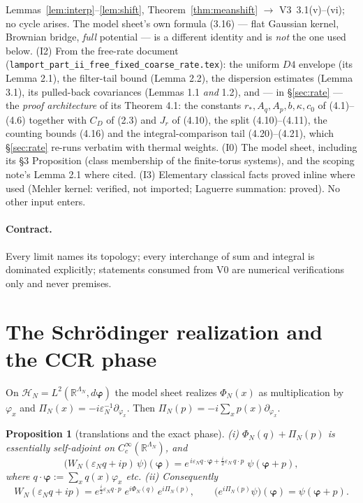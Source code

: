 \documentclass[11pt,a4paper]{article}
\theoremstyle{plain}
\newtheorem{proposition}[theorem]{Proposition}
\theoremstyle{definition}
\newcommand{\R}{\mathbb{R}}
\newcommand{\HH}{\mathcal{H}}
\newcommand{\eps}{\varepsilon}
\begin{document}
Lemmas~\ref{lem:interp}--\ref{lem:shift}, Theorem~\ref{thm:meanshift}
$\to$ V3~3.1(v)--(vi); no cycle arises. The model sheet's own formula (3.16) --- flat Gaussian
kernel, Brownian bridge, \emph{full} potential --- is a different identity and
is \emph{not} the one used below. (I2) From the free-rate document
(\texttt{lamport\_part\_ii\_free\_}\allowbreak\texttt{fixed\_coarse\_rate.tex}): the uniform $D4$
envelope (its Lemma 2.1), the filter-tail bound (Lemma 2.2), the dispersion
estimates (Lemma 3.1), its pulled-back covariances (Lemmas 1.1 \emph{and} 1.2),
and --- in \S\ref{sec:rate} --- the \emph{proof architecture} of its Theorem 4.1:
the constants $r_*,A_q,A_p,b,\kappa,c_0$ of (4.1)--(4.6) together with $C_D$ of (2.3)
and $J_r$ of (4.10), the split (4.10)--(4.11), the counting bounds (4.16) and the
integral-comparison tail (4.20)--(4.21), which \S\ref{sec:rate} re-runs verbatim with thermal weights.
(I0) The model sheet, including its \S3 Proposition (class membership of the
finite-torus systems), and the scoping note's Lemma 2.1 where cited.
(I3) Elementary classical facts proved inline where used (Mehler kernel:
verified, not imported; Laguerre summation: proved). No other input enters.

\paragraph{Contract.} Every limit names its topology; every interchange of sum
and integral is dominated explicitly; statements consumed from V0 are numerical
verifications only and never premises.

\section{The Schr\"odinger realization and the CCR phase}\label{sec:schrod}

On $\HH_N=L^2(\R^{\Lambda_N},d\bm\varphi)$ the model sheet realizes
$\Phi_N(x)$ as multiplication by $\varphi_x$ and $\Pi_N(x)=-i\eps_N^{-1}
\partial_{\varphi_x}$. Then
$\Pi_N(p)=-i\sum_xp(x)\partial_{\varphi_x}$.

\begin{proposition}[translations and the exact phase]\label{prop:phase}
\emph{(i)} $\Phi_N(q)+\Pi_N(p)$ is essentially self-adjoint on
$C_c^\infty(\R^{\Lambda_N})$, and
\begin{equation}
 \bigl(W_N(\eps_Nq+ip)\,\psi\bigr)(\bm\varphi)
 =e^{\,i\eps_Nq\cdot\bm\varphi+\frac i2\eps_N\,q\cdot p}\;
 \psi(\bm\varphi+p),
 \label{eq:Waction}
\end{equation}
where $q\cdot\bm\varphi:=\sum_xq(x)\varphi_x$ etc.
\emph{(ii)} Consequently
\begin{equation}
 W_N(\eps_Nq+ip)=e^{\frac i2\eps_N q\cdot p}\;
 e^{i\Phi_N(q)}\,e^{i\Pi_N(p)},
 \qquad
 \bigl(e^{i\Pi_N(p)}\psi\bigr)(\bm\varphi)=\psi(\bm\varphi+p).
 \label{eq:ccrphase}
\end{equation}
\end{proposition}
\end{document}
